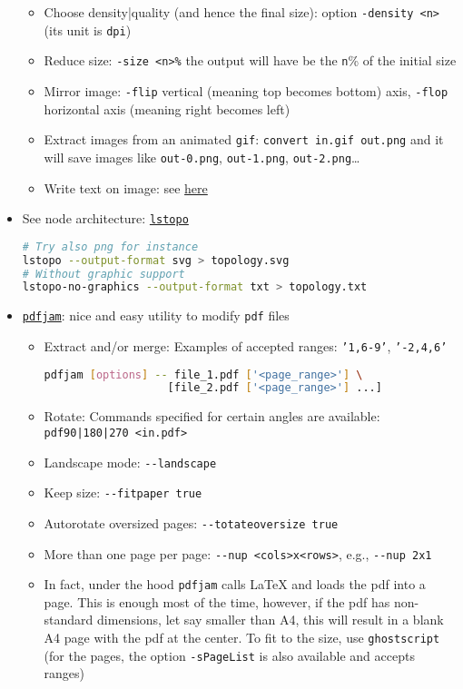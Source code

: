 \documentclass[a4paper,12pt,%
              final%
              ]{article}
\begin{document}
\begin{itemize}
\begin{itemize}
      \item Choose density|quality (and hence the final size): option \verb|-density <n>| (its unit is \texttt{dpi})
      \item Reduce size: \verb|-size <n>%| the output will have be the \verb|n|\% of the initial size
      \item Mirror image: \verb|-flip| vertical (meaning top becomes bottom) axis, \verb|-flop| horizontal axis (meaning right becomes left)
      \item Extract images from an animated \texttt{gif}: \verb|convert in.gif out.png| and it will save images like \texttt{out-0.png}, \texttt{out-1.png}, \texttt{out-2.png}\ldots
      \item Write text on image: see \href{https://stackoverflow.com/questions/23236898/add-text-on-image-at-specific-point-using-imagemagick}{here}
    \end{itemize}
  \item See node architecture: \href{https://linux.die.net/man/1/lstopo}{\texttt{lstopo}}
\begin{lstlisting}[language=bash]
# Try also png for instance
lstopo --output-format svg > topology.svg
# Without graphic support
lstopo-no-graphics --output-format txt > topology.txt
\end{lstlisting}
  \item \href{https://github.com/DavidFirth/pdfjam#using}{\texttt{pdfjam}}: nice and easy utility to modify \texttt{pdf} files
    \begin{itemize}
      \item Extract and/or merge: Examples of accepted ranges: \texttt{'1,6-9'}, \texttt{'-2,4,6'}
\begin{lstlisting}[language=bash]
pdfjam [options] -- file_1.pdf ['<page_range>'] \
                   [file_2.pdf ['<page_range>'] ...]
\end{lstlisting}
      \item Rotate: Commands specified for certain angles are available: \verb!pdf90|180|270 <in.pdf>!
      \item Landscape mode: \verb|--landscape|
      \item Keep size: \verb|--fitpaper true|
      \item Autorotate oversized pages: \verb|--totateoversize true|
      \item More than one page per page: \verb|--nup <cols>x<rows>|, e.g., \verb|--nup 2x1|
      \item In fact, under the hood \texttt{pdfjam} calls \LaTeX{} and loads the pdf into a page. This is enough most of the time, however, if the pdf has non-standard dimensions, let say smaller than A4, this will result in a blank A4 page with the pdf at the center. To fit to the size, use \texttt{ghostscript} (for the pages, the option \texttt{-sPageList} is also available and accepts ranges)

\end{itemize}
\end{itemize}
\end{document}

